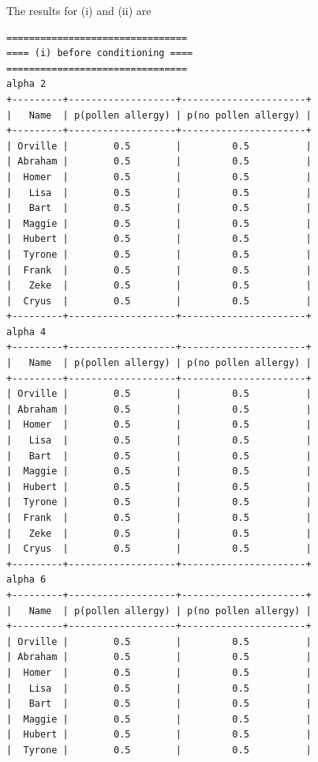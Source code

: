 \documentclass{article}
\begin{document}
The results for (i) and (ii) are
\lstset{language=Python}
\lstset{frame=lines}
\lstset{basicstyle=\footnotesize}
\begin{lstlisting}
================================
==== (i) before conditioning ====
================================
alpha 2
+---------+-------------------+----------------------+
|   Name  | p(pollen allergy) | p(no pollen allergy) |
+---------+-------------------+----------------------+
| Orville |        0.5        |         0.5          |
| Abraham |        0.5        |         0.5          |
|  Homer  |        0.5        |         0.5          |
|   Lisa  |        0.5        |         0.5          |
|   Bart  |        0.5        |         0.5          |
|  Maggie |        0.5        |         0.5          |
|  Hubert |        0.5        |         0.5          |
|  Tyrone |        0.5        |         0.5          |
|  Frank  |        0.5        |         0.5          |
|   Zeke  |        0.5        |         0.5          |
|  Cryus  |        0.5        |         0.5          |
+---------+-------------------+----------------------+
alpha 4
+---------+-------------------+----------------------+
|   Name  | p(pollen allergy) | p(no pollen allergy) |
+---------+-------------------+----------------------+
| Orville |        0.5        |         0.5          |
| Abraham |        0.5        |         0.5          |
|  Homer  |        0.5        |         0.5          |
|   Lisa  |        0.5        |         0.5          |
|   Bart  |        0.5        |         0.5          |
|  Maggie |        0.5        |         0.5          |
|  Hubert |        0.5        |         0.5          |
|  Tyrone |        0.5        |         0.5          |
|  Frank  |        0.5        |         0.5          |
|   Zeke  |        0.5        |         0.5          |
|  Cryus  |        0.5        |         0.5          |
+---------+-------------------+----------------------+
alpha 6
+---------+-------------------+----------------------+
|   Name  | p(pollen allergy) | p(no pollen allergy) |
+---------+-------------------+----------------------+
| Orville |        0.5        |         0.5          |
| Abraham |        0.5        |         0.5          |
|  Homer  |        0.5        |         0.5          |
|   Lisa  |        0.5        |         0.5          |
|   Bart  |        0.5        |         0.5          |
|  Maggie |        0.5        |         0.5          |
|  Hubert |        0.5        |         0.5          |
|  Tyrone |        0.5        |         0.5          |

\end{lstlisting}
\end{document}
